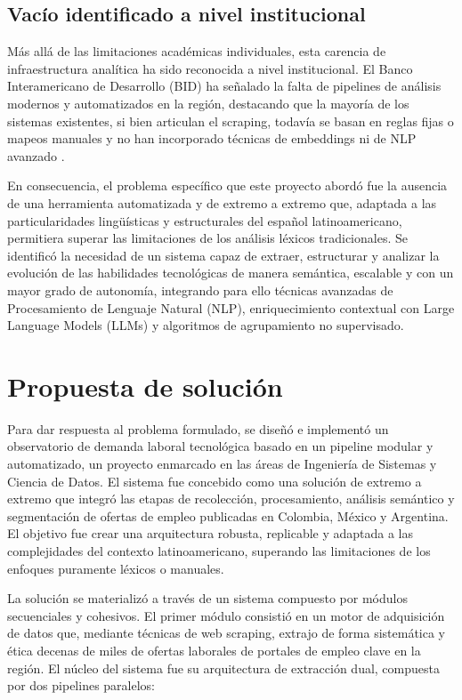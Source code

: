 \subsection{Vacío identificado a nivel institucional}

Más allá de las limitaciones académicas individuales, esta carencia de infraestructura analítica ha sido reconocida a nivel institucional. El Banco Interamericano de Desarrollo (BID) ha señalado la falta de pipelines de análisis modernos y automatizados en la región, destacando que la mayoría de los sistemas existentes, si bien articulan el scraping, todavía se basan en reglas fijas o mapeos manuales y no han incorporado técnicas de embeddings ni de NLP avanzado \parencite{echeverria2022}.

En consecuencia, el problema específico que este proyecto abordó fue la ausencia de una herramienta automatizada y de extremo a extremo que, adaptada a las particularidades lingüísticas y estructurales del español latinoamericano, permitiera superar las limitaciones de los análisis léxicos tradicionales. Se identificó la necesidad de un sistema capaz de extraer, estructurar y analizar la evolución de las habilidades tecnológicas de manera semántica, escalable y con un mayor grado de autonomía, integrando para ello técnicas avanzadas de Procesamiento de Lenguaje Natural (NLP), enriquecimiento contextual con Large Language Models (LLMs) y algoritmos de agrupamiento no supervisado.

\section{Propuesta de solución}

Para dar respuesta al problema formulado, se diseñó e implementó un observatorio de demanda laboral tecnológica basado en un pipeline modular y automatizado, un proyecto enmarcado en las áreas de Ingeniería de Sistemas y Ciencia de Datos. El sistema fue concebido como una solución de extremo a extremo que integró las etapas de recolección, procesamiento, análisis semántico y segmentación de ofertas de empleo publicadas en Colombia, México y Argentina. El objetivo fue crear una arquitectura robusta, replicable y adaptada a las complejidades del contexto latinoamericano, superando las limitaciones de los enfoques puramente léxicos o manuales.

La solución se materializó a través de un sistema compuesto por módulos secuenciales y cohesivos. El primer módulo consistió en un motor de adquisición de datos que, mediante técnicas de web scraping, extrajo de forma sistemática y ética decenas de miles de ofertas laborales de portales de empleo clave en la región. El núcleo del sistema fue su arquitectura de extracción dual, compuesta por dos pipelines paralelos:

